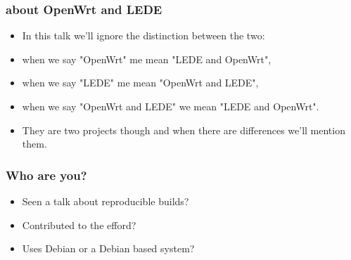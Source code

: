 \documentclass[14pt,aspectratio=169]{beamer}
\begin{document}
\begin{frame}
 \frametitle{about OpenWrt and LEDE}

 \begin{itemize}
  \item In this talk we'll ignore the distinction between the two:
  \item when we say "OpenWrt" me mean "LEDE and OpenWrt",
  \item when we say "LEDE" me mean "OpenWrt and LEDE",
  \item when we say "OpenWrt and LEDE" we mean "LEDE and OpenWrt".
  \item<2> They are two projects though and when there are differences we'll
  mention them.
 \end{itemize}

\end{frame}


\begin{frame}
 \frametitle{Who are you?}
 \begin{itemize}
  \item<2-4> Seen a talk about reproducible builds?
  \item<3-4> Contributed to the efford?
  \item<4> Uses Debian or a Debian based system?
 \end{itemize}
\end{frame}
\end{document}
